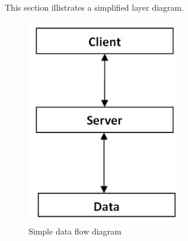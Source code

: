 This section illistrates a simplified layer diagram. 

\begin{figure}[h!]
	\centering
 	\includegraphics[width=0.6\textwidth]{images/LayerBlockDiagram}
 \caption{Simple data flow diagram}
\end{figure}
